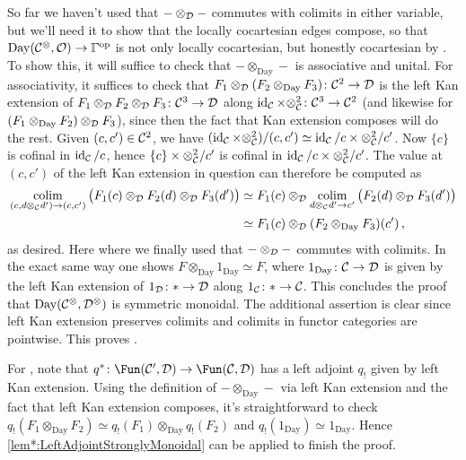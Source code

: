 \begin{proof*}
	So far we haven't used that $-\otimes_{\mathcal{D}}-$ commutes with colimits in either variable, but we'll need it to show that the locally cocartesian edges compose, so that $\operatorname{Day}(\Cc^\otimes,\Oo)\morphism\IGamma^\op$ is not only locally cocartesian, but honestly cocartesian by \cite[Proposition~IX.13]{HigherCatsII}. To show this, it will suffice to check that $-\otimes_{\operatorname{Day}}-$ is associative and unital. For associativity, it suffices to check that $F_1\otimes_\Dd (F_2\otimes_{\operatorname{Day}} F_3)\colon \Cc^2\morphism \Dd$ is the left Kan extension of $F_1\otimes_\Dd F_2\otimes_\Dd F_3\colon \Cc^3\morphism \Dd$ along $\id_\Cc\times \otimes_\Cc^2\colon \Cc^3\morphism\Cc^2$ (and likewise for $(F_1\otimes_{\operatorname{Day}} F_2)\otimes_{\mathcal{D}} F_3$), since then the fact that Kan extension composes will do the rest. Given $(c,c')\in \mathcal{C}^2$, we have $(\operatorname{id}_{\mathcal{C}}\times \otimes_{\mathcal{C}}^2)/(c,c')\simeq \operatorname{id}_{\mathcal{C}}/c\times \otimes_{\mathcal{C}}^2/c'$. Now $\{c\}$ is cofinal in $\operatorname{id}_{\mathcal{C}}/c$, hence $\{c\}\times \otimes_{\mathcal{C}}^2/c'$ is cofinal in $\operatorname{id}_{\mathcal{C}}/c\times \otimes_{\mathcal{C}}^2/c'$. The value at $(c,c')$ of the left Kan extension in question can therefore be computed as
	\begin{align*}
		\colimit_{(c,d\otimes_\Cc d')\morphism (c,c')}\big( F_1(c)\otimes_\Dd F_2(d)\otimes_\Dd F_3(d')\big)&\simeq F_1(c)\otimes_\Dd \colimit_{d\otimes_\Cc d'\morphism c'}\big(F_2(d)\otimes_\Dd F_3(d')\big)\\
		&\simeq F_1(c)\otimes_\Dd (F_2\otimes_{\operatorname{Day}}F_3)(c')\,,
	\end{align*}
	as desired. Here where we finally used that $-\otimes_{\mathcal{D}}-$ commutes with colimits. In the exact same way one shows $F\otimes_{\operatorname{Day}}1_{\operatorname{Day}}\simeq F$, where $1_{\operatorname{Day}}\colon \Cc\morphism\Dd$ is given by the left Kan extension of $1_\Dd\colon *\morphism \Dd$ along $1_\Cc\colon *\morphism\Cc$. This concludes the proof that $\operatorname{Day}(\mathcal{C}^\otimes,\mathcal{D}^\otimes)$ is symmetric monoidal. The additional assertion is clear since left Kan extension preserves colimits and colimits in functor categories are pointwise. This proves .
	
	For , note that $q^*\colon \Fun(\Cc',\Dd)\morphism \Fun(\Cc,\Dd)$ has a left adjoint $q_!$ given by left Kan extension. Using the definition of $-\otimes_{\operatorname{Day}}-$ via left Kan extension and the fact that left Kan extension composes, it's straightforward to check $q_!(F_1\otimes_{\operatorname{Day}}F_2)\simeq q_!(F_1)\otimes_{\operatorname{Day}} q_!(F_2)$ and $q_!(1_{\operatorname{Day}})\simeq 1_{\operatorname{Day}}$. Hence \cref{lem*:LeftAdjointStronglyMonoidal} can be applied to finish the proof.
\end{proof*}
